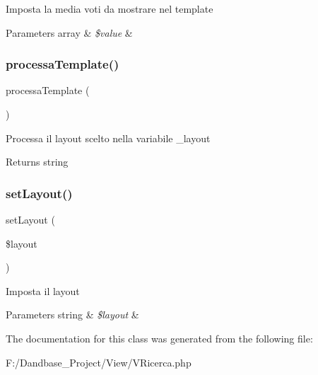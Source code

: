 Imposta la media voti da mostrare nel template


\begin{DoxyParams}[1]{Parameters}
array & {\em \$value} & \\
\hline
\end{DoxyParams}
\mbox{\label{class_v_ricerca_a64bdc484fc7074989b4b2c0ebc63aec2}} 
\subsubsection{\texorpdfstring{processa\+Template()}{processaTemplate()}}
{\footnotesize\ttfamily processa\+Template (\begin{DoxyParamCaption}{ }\end{DoxyParamCaption})}

Processa il layout scelto nella variabile \+\_\+layout

\begin{DoxyReturn}{Returns}
string 
\end{DoxyReturn}
\mbox{\label{class_v_ricerca_a702b3376618a26e6c02c05bae65c6b9e}} 
\subsubsection{\texorpdfstring{set\+Layout()}{setLayout()}}
{\footnotesize\ttfamily set\+Layout (\begin{DoxyParamCaption}\item[{}]{\$layout }\end{DoxyParamCaption})}

Imposta il layout


\begin{DoxyParams}[1]{Parameters}
string & {\em \$layout} & \\
\hline
\end{DoxyParams}


The documentation for this class was generated from the following file\+:\begin{DoxyCompactItemize}
\item 
F\+:/\+Dandbase\+\_\+\+Project/\+View/V\+Ricerca.\+php\end{DoxyCompactItemize}
